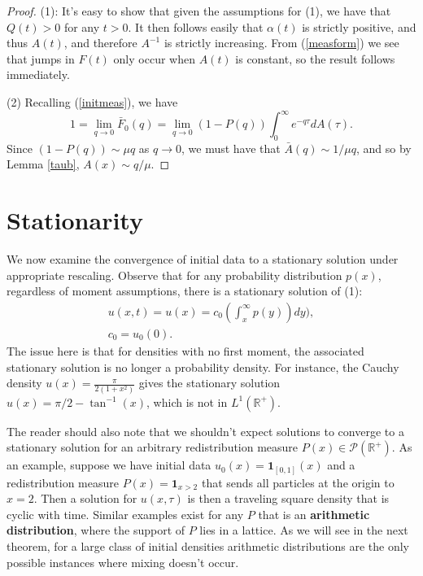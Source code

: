 \begin{proof}
(1): It's easy to show that given the assumptions for (1), we have that $Q(t)>0$ for any $t>0$.  It then follows easily that $\alpha(t)$ is strictly positive, and thus $A(t)$, and therefore $A^{-1}$ is strictly increasing. From (\ref{measform}) we see that jumps in $F(t)$ only occur when $A(t)$ is constant, so the result follows immediately.

(2) Recalling (\ref{initmeas}), we have
\begin{equation}
1 = \lim_{q \rightarrow 0} \bar F_0(q) = \lim_{q \rightarrow 0} (1-P(q)) \int_0^\infty e^{-q\tau}dA(\tau) . 
\end{equation} 
Since $(1-P(q)) \sim \mu q$ as $q\rightarrow 0$, we must have that $\bar A(q) \sim1/\mu q$, and so by Lemma \ref{taub}, $A(x) \sim q/\mu$.
\end{proof}

 

\section{Stationarity}\label{statio}

We now examine the convergence of initial data to a stationary solution under appropriate rescaling. Observe that for any probability distribution $p(x)$, regardless of moment assumptions, there is  a stationary solution of (1):
\begin{eqnarray}
u(x,t) = u(x) = c_{0}(\int_x^\infty p(y))dy) ,\\
c_0 = u_0(0).
\end{eqnarray}
 The issue here is that for densities with no first moment, the associated stationary solution is no longer a probability density.  For instance, the Cauchy density $u(x) = \frac \pi {2(1+x^2)}$ gives the stationary solution  $u(x) = \pi/2-\tan^{-1}(x)$, which is not in $L^1(\mathbb{R}^+)$.  

The reader should also note that we shouldn't  expect solutions to converge to a stationary solution for an arbitrary redistribution measure $P(x)\in \mathcal P(\mathbb{R}^+)$.  As an example, suppose we have initial data $u_0(x) = \mathbf 1_{[0,1]}(x)$  and a redistribution measure  $P(x) = \textbf{1}_{x>2}$ that sends all particles at the origin to $x=2$. Then a solution for $u(x, \tau)$ is then a traveling square density that is cyclic with time. Similar examples exist for any $P$ that is an  \textbf{arithmetic distribution}, where the support of $P$ lies in a lattice.  As we will see in the next theorem,  for a large class of initial densities arithmetic distributions are the only possible instances where mixing doesn't occur.




